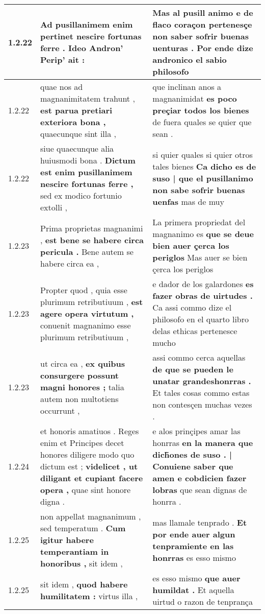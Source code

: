 \begin{tabular}{|p{1cm}|p{6.5cm}|p{6.5cm}|}
1.2.22 & Ad pusillanimem enim pertinet \textbf{ nescire fortunas ferre . } Ideo Andron’ Perip’ ait : & Mas al pusill animo \textbf{ e de flaco coraçon pertenesçe non saber sofrir buenas uenturas . } Por ende dize andronico el sabio philosofo \\\hline
1.2.22 & quae nos ad magnanimitatem trahunt , \textbf{ est parua pretiari exteriora bona , } quaecunque sint illa , & que inclinan anos a magnanimidat \textbf{ es poco preçiar todos los bienes } de fuera quales se quier que sean . \\\hline
1.2.22 & siue quaecunque alia huiusmodi bona . \textbf{ Dictum est enim pusillanimem nescire fortunas ferre , } sed ex modico fortunio extolli , & si quier quales si quier otros tales bienes \textbf{ Ca dicho es de suso | que el pusillanimo non sabe sofrir buenas uenfas } mas de muy \\\hline
1.2.23 & Prima proprietas magnanimi , \textbf{ est bene se habere circa pericula . } Bene autem se habere circa ea , & La primera propriedat del magnanimo es \textbf{ que se deue bien auer çerca los periglos } Mas auer se bien çerca los periglos \\\hline
1.2.23 & Propter quod , quia esse plurimum retributiuum , \textbf{ est agere opera virtutum , } conuenit magnanimo esse plurimum retributiuum , & e dador de los galardones \textbf{ es fazer obras de uirtudes . } Ca assi commo dize el philosofo en el quarto libro delas ethicas pertenesce mucho \\\hline
1.2.23 & ut circa ea , \textbf{ ex quibus consurgere possunt magni honores ; } talia autem non multotiens occurrunt , & assi commo cerca aquellas \textbf{ de que se pueden le unatar grandeshonrras . } Et tales cosas commo estas non contesçen muchas vezes . \\\hline
1.2.24 & et honoris amatiuos . Reges enim et Principes decet honores diligere modo quo dictum est ; \textbf{ videlicet , ut diligant et cupiant facere opera , } quae sint honore digna . & e alos prinçipes amar las honrras \textbf{ en la manera que dich̃ones de suso . | Conuiene saber que amen e cobdicien fazer lobras } que sean dignas de honrra . \\\hline
1.2.25 & non appellat magnanimum , sed temperatum . \textbf{ Cum igitur habere temperantiam in honoribus , } sit idem , & mas llamale tenprado . \textbf{ Et por ende auer algun tenpramiente en las honrras } es esso mismo \\\hline
1.2.25 & sit idem , \textbf{ quod habere humilitatem : } virtus illa , & es esso mismo \textbf{ que auer humildat . } Et aquella uirtud o razon de tenprança \\\hline

\end{tabular}

